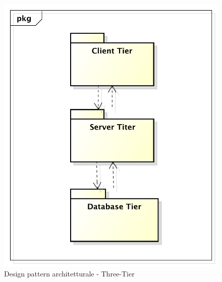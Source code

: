 		\begin{figure}[htbp]
			\centering
			\centerline{\includegraphics[scale=0.5]{./images/designpatternappendice/three_tier.pdf}}
			\caption{Design pattern architetturale - Three-Tier}
		\end{figure}


